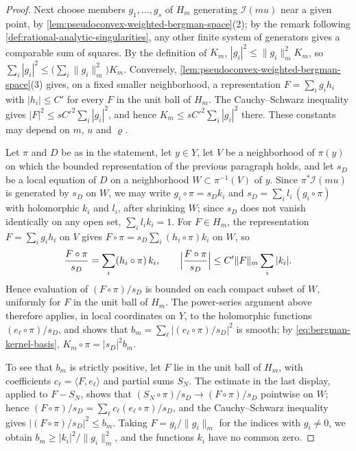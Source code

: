 \begin{proof}
Next choose members $g_1,\ldots,g_s$ of $H_m$ generating $\mathcal I(mu)$ near a given point, by \cref{lem:pseudoconvex-weighted-bergman-space}(2); by the remark following \cref{def:rational-analytic-singularities}, any other finite system of generators gives a comparable sum of squares. By the definition of $K_m$, $|g_i|^2\leq\|g_i\|_m^2K_m$, so $\sum_i|g_i|^2\leq\bigl(\sum_i\|g_i\|_m^2\bigr)K_m$. Conversely, \cref{lem:pseudoconvex-weighted-bergman-space}(3) gives, on a fixed smaller neighborhood, a representation $F=\sum_ig_ih_i$ with $|h_i|\leq C'$ for every $F$ in the unit ball of $H_m$. The Cauchy--Schwarz inequality gives $|F|^2\leq sC'^2\sum_i|g_i|^2$, and hence $K_m\leq sC'^2\sum_i|g_i|^2$ there. These constants may depend on $m$, $u$ and $\varrho$.

Let $\pi$ and $D$ be as in the statement, let $y\in Y$, let $V$ be a neighborhood of $\pi(y)$ on which the bounded representation of the previous paragraph holds, and let $s_D$ be a local equation of $D$ on a neighborhood $W\subset\pi^{-1}(V)$ of $y$. Since $\pi^*\mathcal I(mu)$ is generated by $s_D$ on $W$, we may write $g_i\circ\pi=s_Dk_i$ and $s_D=\sum_il_i\,(g_i\circ\pi)$ with holomorphic $k_i$ and $l_i$, after shrinking $W$; since $s_D$ does not vanish identically on any open set, $\sum_il_ik_i=1$. For $F\in H_m$, the representation $F=\sum_ig_ih_i$ on $V$ gives $F\circ\pi=s_D\sum_i(h_i\circ\pi)k_i$ on $W$, so
\[
 \frac{F\circ\pi}{s_D}=\sum_i(h_i\circ\pi)\,k_i,\qquad\Bigl|\frac{F\circ\pi}{s_D}\Bigr|\leq C'\|F\|_m\sum_i|k_i|.
\]
Hence evaluation of $(F\circ\pi)/s_D$ is bounded on each compact subset of $W$, uniformly for $F$ in the unit ball of $H_m$. The power-series argument above therefore applies, in local coordinates on $Y$, to the holomorphic functions $(e_\ell\circ\pi)/s_D$, and shows that $b_m=\sum_\ell|(e_\ell\circ\pi)/s_D|^2$ is smooth; by \eqref{eq:bergman-kernel-basis}, $K_m\circ\pi=|s_D|^2b_m$.

To see that $b_m$ is strictly positive, let $F$ lie in the unit ball of $H_m$, with coefficients $c_\ell=\langle F,e_\ell\rangle$ and partial sums $S_N$. The estimate in the last display, applied to $F-S_N$, shows that $(S_N\circ\pi)/s_D\to(F\circ\pi)/s_D$ pointwise on $W$; hence $(F\circ\pi)/s_D=\sum_\ell c_\ell(e_\ell\circ\pi)/s_D$, and the Cauchy--Schwarz inequality gives $|(F\circ\pi)/s_D|^2\leq b_m$. Taking $F=g_i/\|g_i\|_m$ for the indices with $g_i\neq0$, we obtain $b_m\geq|k_i|^2/\|g_i\|_m^2$, and the functions $k_i$ have no common zero.
\end{proof}

